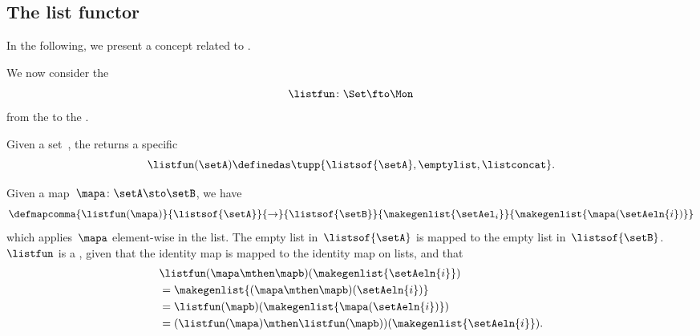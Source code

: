 \subsection{The list functor}
In the following, we present a concept related to .

We now consider the 
\begin{equation}
    \listfun\colon \Set \fto \Mon
\end{equation}
from the  to the .

Given a set~\setA, the  returns a specific 
\begin{equation}
    \listfun(\setA)\definedas\tupp{\listsof{\setA},\emptylist, \listconcat}.
\end{equation}

Given a map~$\mapa\colon \setA \sto \setB$, we have
\begin{equation}
    \defmapcomma{
        \listfun(\mapa)
    }{
        \listsof{\setA}
    }{
        \to
    }{
        \listsof{\setB}
    }{
        \makegenlist{ \setAel_i }
    }{
        \makegenlist{  \mapa(\setAeln{i}) }
    }
\end{equation}
which applies~$\mapa$ element-wise in the list.
The empty list in~$\listsof{\setA}$ is mapped to the empty list in~$\listsof{\setB}$.
    {}
$\listfun$ is a , given that the identity map is mapped to the identity map on lists, and that
\begin{equation}
    \begin{aligned}
         & \listfun(\mapa \mthen \mapb)(\makegenlist{\setAeln{i}}) \\ & =\makegenlist{ (\mapa \mthen \mapb)(\setAeln{i})} \\
         & =\listfun(\mapb)(\makegenlist{\mapa(\setAeln{i})}) \\
         & =(\listfun(\mapa)\mthen \listfun(\mapb))(\makegenlist{\setAeln{i}}).
    \end{aligned}
\end{equation}


